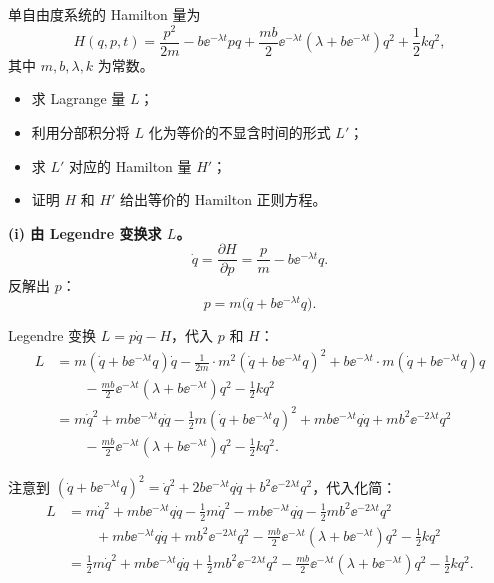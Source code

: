 \begin{question}
单自由度系统的 Hamilton 量为
\[
H(q,p,t) = \frac{p^2}{2m} - b \ee^{-\lambda t} p q + \frac{mb}{2} \ee^{-\lambda t}(\lambda + b \ee^{-\lambda t}) q^2 + \frac12 k q^2,
\]
其中 \(m,b,\lambda,k\) 为常数。

\begin{itemize}
  \item[(i)] 求 Lagrange 量 \(L\)；
  \item[(ii)] 利用分部积分将 \(L\) 化为等价的不显含时间的形式 \(L'\)；
  \item[(iii)] 求 \(L'\) 对应的 Hamilton 量 \(H'\)；
  \item[(iv)] 证明 \(H\) 和 \(H'\) 给出等价的 Hamilton 正则方程。
\end{itemize}

\begin{solution}
\textbf{(i) 由 Legendre 变换求 \(L\)。}
\[
\dot q = \frac{\partial H}{\partial p} = \frac{p}{m} - b \ee^{-\lambda t} q .
\]
反解出 \(p\)：
\[
p = m\bigl(\dot q + b \ee^{-\lambda t} q\bigr).
\]

Legendre 变换 \(L = p\dot q - H\)，代入 \(p\) 和 \(H\)：
\[
\begin{aligned}
L &= m(\dot q + b \ee^{-\lambda t} q)\dot q
- \frac{1}{2m}\cdot m^2(\dot q + b \ee^{-\lambda t} q)^2
+ b \ee^{-\lambda t}\cdot m(\dot q + b \ee^{-\lambda t} q) q \\
&\qquad - \frac{mb}{2} \ee^{-\lambda t}(\lambda + b \ee^{-\lambda t})q^2 - \frac12 k q^2 \\[2mm]
&= m\dot q^2 + m b \ee^{-\lambda t} q\dot q
- \frac12 m(\dot q + b \ee^{-\lambda t} q)^2
+ m b \ee^{-\lambda t} q\dot q + m b^2 \ee^{-2\lambda t} q^2 \\
&\qquad - \frac{mb}{2} \ee^{-\lambda t}(\lambda + b \ee^{-\lambda t}) q^2 - \frac12 k q^2 .
\end{aligned}
\]

注意到 \((\dot q + b \ee^{-\lambda t} q)^2 = \dot q^2 + 2b \ee^{-\lambda t} q\dot q + b^2 \ee^{-2\lambda t} q^2\)，代入化简：
\[
\begin{aligned}
L &= m\dot q^2 + m b \ee^{-\lambda t} q\dot q
- \frac12 m\dot q^2 - m b \ee^{-\lambda t} q\dot q - \frac12 m b^2 \ee^{-2\lambda t} q^2 \\
&\qquad + m b \ee^{-\lambda t} q\dot q + m b^2 \ee^{-2\lambda t} q^2
- \frac{mb}{2} \ee^{-\lambda t}(\lambda + b \ee^{-\lambda t}) q^2 - \frac12 k q^2 \\[2mm]
&= \frac12 m\dot q^2 + m b \ee^{-\lambda t} q\dot q
+ \frac12 m b^2 \ee^{-2\lambda t} q^2
- \frac{mb}{2} \ee^{-\lambda t}(\lambda + b \ee^{-\lambda t}) q^2 - \frac12 k q^2 .
\end{aligned}
\]


\end{solution}
\end{question}
